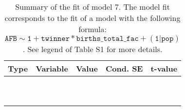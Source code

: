 \begin{table}[H]

\caption{\label{tab:tab7}Summary of the fit of model 7. The model fit corresponds to the fit of a model with the following formula: {\small$\mathtt{AFB \sim 1 + twinner * births\_total\_fac + (1 | pop)}$}. See legend of Table S1 for more details.}
\centering
\fontsize{8}{10}\selectfont
\begin{tabular}[t]{>{\raggedright\arraybackslash}p{3cm}>{\raggedright\arraybackslash}p{5cm}rrr}
\toprule
Type & Variable & Value & Cond. SE & t-value\\
\midrule
\cellcolor{gray!6}{fixed effects} & \cellcolor{gray!6}{$\beta_1$} & \cellcolor{gray!6}{5.86} & \cellcolor{gray!6}{0.0123} & \cellcolor{gray!6}{479}\\
\cellcolor{gray!6}{} & \cellcolor{gray!6}{$\beta_{\mathtt{twinner}}$} & \cellcolor{gray!6}{0.0752} & \cellcolor{gray!6}{0.0207} & \cellcolor{gray!6}{3.63}\\
\cellcolor{gray!6}{} & \cellcolor{gray!6}{$\beta_{\mathtt{births\_total\_fac2}}$} & \cellcolor{gray!6}{-0.0396} & \cellcolor{gray!6}{0.00461} & \cellcolor{gray!6}{-8.6}\\
\cellcolor{gray!6}{} & \cellcolor{gray!6}{$\beta_{\mathtt{births\_total\_fac3}}$} & \cellcolor{gray!6}{-0.0686} & \cellcolor{gray!6}{0.00462} & \cellcolor{gray!6}{-14.8}\\
\cellcolor{gray!6}{} & \cellcolor{gray!6}{$\beta_{\mathtt{births\_total\_fac4}}$} & \cellcolor{gray!6}{-0.0977} & \cellcolor{gray!6}{0.00465} & \cellcolor{gray!6}{-21}\\
\cellcolor{gray!6}{} & \cellcolor{gray!6}{$\beta_{\mathtt{births\_total\_fac5}}$} & \cellcolor{gray!6}{-0.122} & \cellcolor{gray!6}{0.00477} & \cellcolor{gray!6}{-25.6}\\
\cellcolor{gray!6}{} & \cellcolor{gray!6}{$\beta_{\mathtt{births\_total\_fac6}}$} & \cellcolor{gray!6}{-0.156} & \cellcolor{gray!6}{0.00486} & \cellcolor{gray!6}{-32.1}\\
\cellcolor{gray!6}{} & \cellcolor{gray!6}{$\beta_{\mathtt{births\_total\_fac7}}$} & \cellcolor{gray!6}{-0.182} & \cellcolor{gray!6}{0.00513} & \cellcolor{gray!6}{-35.5}\\
\cellcolor{gray!6}{} & \cellcolor{gray!6}{$\beta_{\mathtt{births\_total\_fac8}}$} & \cellcolor{gray!6}{-0.217} & \cellcolor{gray!6}{0.00536} & \cellcolor{gray!6}{-40.5}\\
\cellcolor{gray!6}{} & \cellcolor{gray!6}{$\beta_{\mathtt{births\_total\_fac9}}$} & \cellcolor{gray!6}{-0.244} & \cellcolor{gray!6}{0.00601} & \cellcolor{gray!6}{-40.7}\\

\end{tabular}
\end{table}
